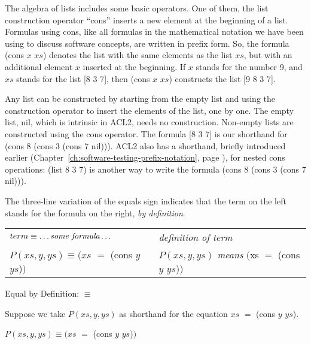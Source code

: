 The algebra of lists includes some basic operators.
One of them, the
list construction
operator ``cons''
inserts a new element at the beginning of a list.
Formulas using cons, like all formulas in
the mathematical notation we have been using to discuss software concepts,
are written in prefix form.
So, the formula (cons $x$ $xs$) denotes the list
with the same elements as the list $xs$,
but with an additional element $x$ inserted at the beginning.
If $x$ stands for the number 9,
and $xs$ stands for the list [8 3 7],
then (cons $x$ $xs$) constructs the list [9 8 3 7].

Any list can be constructed by starting from the empty list
and using the construction operator to insert the elements of the list, one by one.
The empty list, nil, which is intrinsic in ACL2, needs no construction.
Non-empty lists are constructed using the cons operator.
The formula [8 3 7] is our shorthand for (cons 8 (cons 3 (cons 7 nil))).
ACL2 also has a shorthand, briefly introduced earlier
(Chapter~\ref{ch:software-testing-prefix-notation}, page \pageref{list-op-informal}),
for nested cons operations: (list 8 3 7) is another way to write the formula
(cons 8 (cons 3 (cons 7 nil))).

\begin{aside}
The
three-line
variation of the equals sign
indicates that the term on the left stands
for the formula on the right, \emph{by definition}.
\begin{center}
\begin{tabular}{ll}
$term \equiv \dots \emph{some formula} \dots$    &\emph{definition of term} \\
$P(xs, y, ys) \equiv (xs$ $=$ (cons $y$ $ys$)$)$ &$P(xs, y, ys)$ \emph{means} $($xs $=$ (cons $y$ $ys$)$)$  \\
\end{tabular}
\end{center}
\caption{Equal by Definition: $\equiv$}
\label{three-line-equal}
\end{aside}

Suppose we take $P(xs, y, ys)$ as shorthand
for the equation $xs$ $=$ (cons $y$ $ys$).
\begin{center}
$P(xs, y, ys) \equiv (xs$ $=$ (cons $y$ $ys$)$)$
\end{center}

